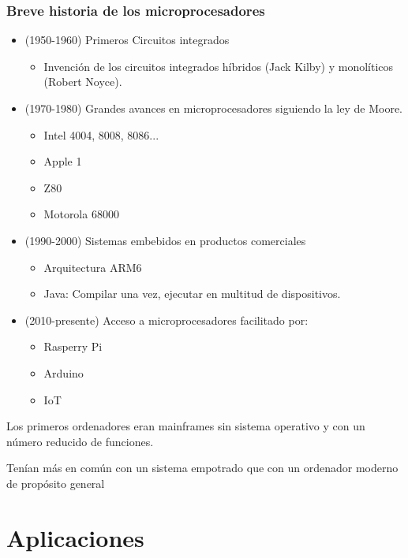 \subsubsection{Breve historia de los microprocesadores}
\begin{itemize}
	\item (1950-1960) Primeros Circuitos integrados
	      \begin{itemize}
		      \item Invención de los circuitos integrados híbridos (Jack Kilby) y monolíticos (Robert Noyce).
	      \end{itemize}
	\item (1970-1980) Grandes avances en microprocesadores siguiendo la ley de Moore.
	      \begin{itemize}
		      \item Intel 4004, 8008, 8086...
		      \item Apple 1
		      \item Z80
		      \item Motorola 68000
	      \end{itemize}
	\item (1990-2000) Sistemas embebidos en productos comerciales
	      \begin{itemize}
		      \item Arquitectura ARM6
		      \item Java: Compilar una vez, ejecutar en multitud de dispositivos.
	      \end{itemize}
	\item (2010-presente) Acceso a microprocesadores facilitado por:
	      \begin{itemize}
		      \item Rasperry Pi
		      \item Arduino
		      \item IoT
	      \end{itemize}
\end{itemize}
Los primeros ordenadores eran mainframes sin sistema operativo y con un número reducido de funciones.

Tenían más en común con un sistema empotrado que con un ordenador moderno de propósito general

\section{Aplicaciones}













